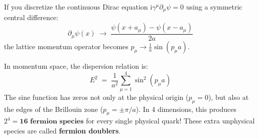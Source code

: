 \documentclass[
    12pt,
    a4paper,
    headings=normal,
    twoside=false,
    open=any,
    parskip=half
]{scrbook}
\newcommand{\iu}{\mathrm{i}}
\begin{document}
If you discretize the continuous Dirac equation $\iu \gamma^\mu \partial_\mu \psi = 0$ using a symmetric central difference:
\begin{equation}
\partial_\mu \psi(x) \;\longrightarrow\; \frac{\psi(x + a_\mu) - \psi(x - a_\mu)}{2a}
\end{equation}
the lattice momentum operator becomes $p_\mu \to \frac{1}{a}\sin(p_\mu a)$. 

In momentum space, the dispersion relation is:
\begin{equation}
E^2 \;=\; \frac{1}{a^2}\sum_{\mu=1}^4 \sin^2(p_\mu a)
\end{equation}
The sine function has zeros not only at the physical origin ($p_\mu = 0$), but also at the edges of the Brillouin zone ($p_\mu = \pm \pi/a$). In 4 dimensions, this produces $2^4 = \mathbf{16 \text{ fermion species}}$ for every single physical quark! These extra unphysical species are called \textbf{fermion doublers}.
\end{document}

